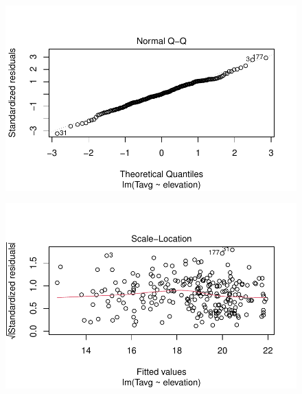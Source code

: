 \documentclass[
  letterpaper,
  DIV=11,
  numbers=noendperiod]{scrreprt}
\begin{document}
\begin{figure}[H]

{\centering \includegraphics{01_RegresionLineal_files/figure-pdf/unnamed-chunk-36-2.pdf}

}

\end{figure}

\begin{figure}[H]

{\centering \includegraphics{01_RegresionLineal_files/figure-pdf/unnamed-chunk-36-3.pdf}

}

\end{figure}
\end{document}
